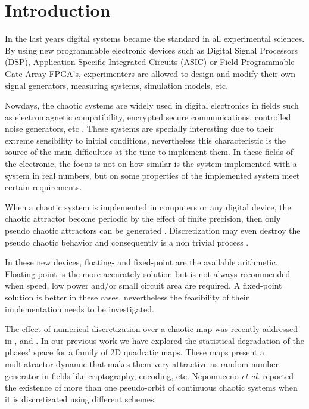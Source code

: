 \section{Introduction} \label{sec:intro}

In the last years digital systems became the standard in all experimental sciences.
By using new programmable electronic devices such as Digital Signal Processors (DSP), Application Specific Integrated Circuits (ASIC) or Field Programmable Gate Array FPGA's, experimenters are allowed to design and modify their own signal generators, measuring systems, simulation models, etc.

Nowdays, the chaotic systems are widely used in digital electronics in fields such as electromagnetic compatibility, encrypted secure communications, controlled noise generators, etc \cite{Machado2004,Smaoui2009,DeMicco2017,Antonelli2012,DeMicco2007A,DeMicco2007B}.
These systems are specially interesting due to their extreme sensibility to initial conditions, nevertheless this characteristic is the source of the main difficulties at the time to implement them.  
In these fields of the electronic, the focus is not on how similar is the system implemented with a system in real numbers, but on some properties of the implemented system meet certain requirements.

When a chaotic system is implemented in computers or any digital device, the chaotic attractor become periodic by the effect of finite precision, then only pseudo chaotic attractors can be generated \cite{Alcover2017,Dias2011}.
Discretization may even destroy the pseudo chaotic behavior and consequently is a non trivial process \cite{DeMicco2017,Azzaz2013}.

In these new devices, floating- and fixed-point are the available arithmetic.
Floating-point is the more accurately solution but is not always recommended when speed, low power and/or small circuit area are required.
A fixed-point solution is better in these cases, nevertheless the feasibility of their implementation needs to be investigated.

The effect of numerical discretization over a chaotic map was recently addressed in \cite{Alcover2017}, \cite{DeMicco2017} and \cite{Nepomuceno2017}.
In our previous work \cite{DeMicco2017} we have explored the statistical degradation of the phases' space for a family of 2D quadratic maps.
These maps present a multiatractor dynamic that makes them very attractive as random number generator in fields like criptography, encoding, etc.
Nepomuceno \textit{et al.} \cite{Nepomuceno2017} reported the existence of more than one pseudo-orbit of continuous chaotic systems when it is discretizated using different schemes.

